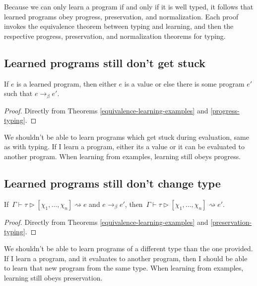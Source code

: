 Because we can only learn a program if and only if it is well typed, it follows that learned programs obey progress, preservation, and normalization. Each proof invokes the equivalence theorem between typing and learning, and then the respective progress, preservation, and normalization theorems for typing.

\subsection{Learned programs still don't get stuck}

\begin{corollary}
If $e$ is a learned program, then either $e$ is a value or else there is some program $e'$ such that $e \to_\beta e'$.
\label{progress-learning}
\end{corollary}
\begin{proof}
Directly from Theorems \ref{equivalence-learning-examples} and \ref{progress-typing}.
\end{proof}
\vspace{-.8em}

We shouldn't be able to learn programs which get stuck during evaluation, same as with typing. If I learn a program, either its a value or it can be evaluated to another program. When learning from examples, learning still obeys progress.

\subsection{Learned programs still don't change type}

\begin{corollary}
If $\,\Gamma \vdash \tau \rhd [\chi_1,\dots,\chi_n] \rightsquigarrow e$ and $e \to_\beta e'$, then $\,\Gamma \vdash \tau \rhd [\chi_1,\dots,\chi_n] \rightsquigarrow e'$.
\label{preservation-learning}
\end{corollary}
\begin{proof}
Directly from Theorems \ref{equivalence-learning-examples} and \ref{preservation-typing}. 
\end{proof}
\vspace{-.8em}

We shouldn't be able to learn programs of a different type than the one provided. If I learn a program, and it evaluates to another program, then I should be able to learn that new program from the same type. When learning from examples, learning still obeys preservation.

